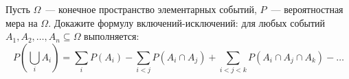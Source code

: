 Пусть $\Omega$~--- конечное пространство элементарных событий, $P$~--- вероятностная мера на
$\Omega$. Докажите формулу включений-исключений: для любых событий $A_1, A_2, \dots, A_n \subseteq
\Omega$ выполняется:
$$
    P\left(\bigcup\limits_i A_i\right) = \sum\limits_{i} P(A_i) - \sum\limits_{i < j} P(A_i \cap A_j) +
    \sum\limits_{i < j < k} P(A_i \cap A_j \cap A_k) - \dots
$$ 